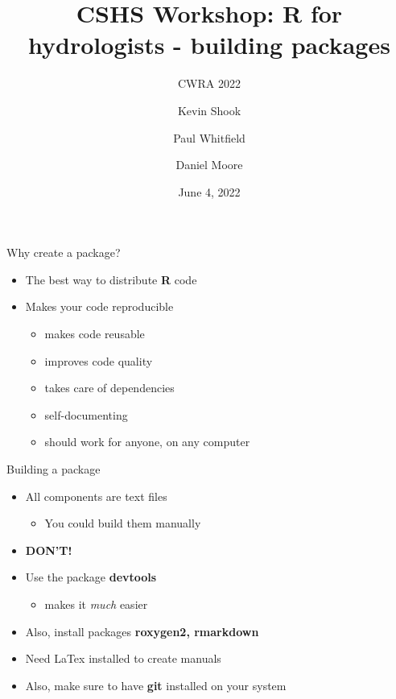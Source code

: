 \documentclass[
  ignorenonframetext,
  aspectratio=169]{beamer}
\title{CSHS Workshop: R for hydrologists - building packages}
\subtitle{CWRA 2022}
\author{Kevin Shook \and Paul Whitfield \and Daniel Moore}
\date{June 4, 2022}
\institute{Canadian Society for Hydrological Sciences (CSHS)}
\providecommand{\tightlist}{%
  \setlength{\itemsep}{0pt}\setlength{\parskip}{0pt}}
\begin{document}
\frame{\titlepage}

\begin{frame}{Why create a package?}
\protect\hypertarget{why-create-a-package}{}
\begin{itemize}
\tightlist
\item
  The best way to distribute \textbf{R} code
\item
  Makes your code reproducible

  \begin{itemize}
  \tightlist
  \item
    makes code reusable
  \item
    improves code quality
  \item
    takes care of dependencies
  \item
    self-documenting
  \item
    should work for anyone, on any computer
  \end{itemize}
\end{itemize}
\end{frame}

\begin{frame}{Building a package}
\protect\hypertarget{building-a-package}{}
\begin{itemize}
\tightlist
\item
  All components are text files

  \begin{itemize}
  \tightlist
  \item
    You could build them manually
  \end{itemize}
\item
  \textbf{DON'T!}
\item
  Use the package \textbf{devtools}

  \begin{itemize}
  \tightlist
  \item
    makes it \emph{much} easier
  \end{itemize}
\item
  Also, install packages \textbf{roxygen2, rmarkdown}
\item
  Need LaTex installed to create manuals
\item
  Also, make sure to have \textbf{git} installed on your system
\end{itemize}
\end{frame}
\end{document}
